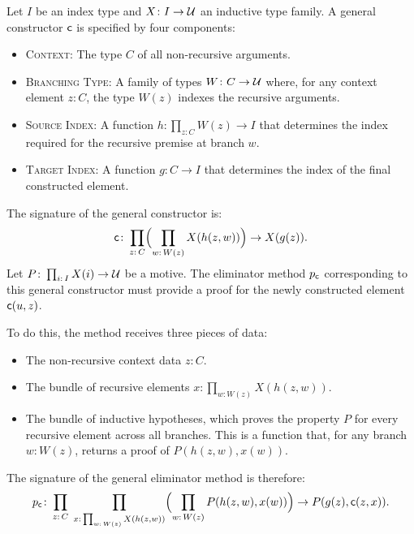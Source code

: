 \begin{defn}
    Let $I$ be an index type and $X\colon I\to\univ$ an inductive type family. A general constructor $\mathsf{c}$ is specified by four components:
    \begin{itemize}
        \item \textsc{Context:} The type $C$ of all non-recursive arguments.
        \item \textsc{Branching Type:} A family of types $W\colon C\to\univ$ where, for any context element $z\colon C$, the type $W(z)$ indexes the recursive arguments.
        
        \item \textsc{Source Index:} A function $h\colon\prod_{z\colon C}W(z)\to I$ that determines the index required for the recursive premise at branch $w$.
        
        \item \textsc{Target Index:} A function $g \colon C \to I$ that determines the index of the final constructed element.
    \end{itemize}
    The signature of the general constructor is:
    \begin{equation}\label{eq:general-inductive-family-constructor}
        \fun c\colon
            \prod_{z\colon C}
            \Bigl(
                \prod_{w\colon W(z)}X(h(z,w))
            \Bigr)
            \to X(g(z)).
    \end{equation}
    Let $P\colon\prod_{i\colon I}X(i)\to\univ$ be a motive. The eliminator method $p_{\mathsf{c}}$ corresponding to this general constructor must provide a proof for the newly constructed element $\mathsf{c}(u,z)$. 
    
    To do this, the method receives three pieces of data:
    \begin{itemize}
        \item The non-recursive context data $z\colon C$.

        \item The bundle of recursive elements $x\colon\prod_{w\colon W(z)} X(h(z,w))$.
        
        \item The bundle of inductive hypotheses, which proves the property $P$ for every recursive element across all branches. This is a function that, for any branch $w\colon W(z)$, returns a proof of $P(h(z,w),x(w))$.
    \end{itemize}
    The signature of the general eliminator method is therefore:
    \[
        p_{\fun c}\colon
            \prod_{z\colon C}\;
            \prod_{x\colon\prod_{w\colon W(z)}X(h(z,w))}
                \Bigl(
                    \prod_{w\colon W(z)}P(h(z,w),x(w))
                \Bigr)
                \to P(g(z),\fun c(z,x)).
    \]
\end{defn}

